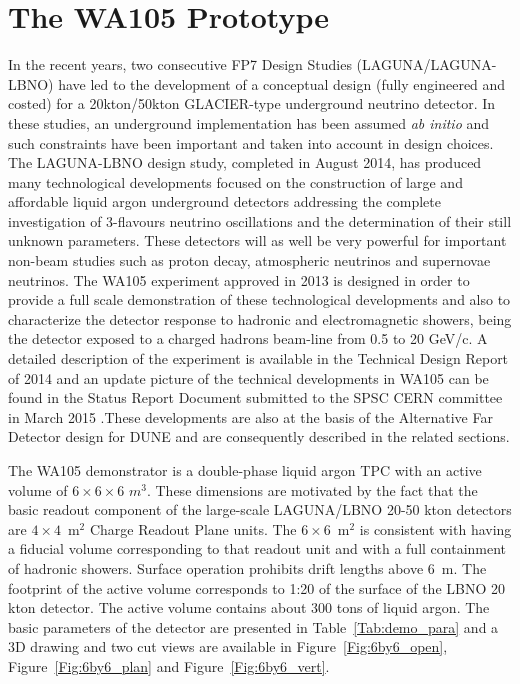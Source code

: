 \section{The WA105 Prototype} 
\label{sec:proto-cern-single}

 In the recent years, two consecutive FP7 Design Studies (LAGUNA/LAGUNA-LBNO) have led to the development
of a conceptual design (fully engineered and costed) for a 20kton/50kton GLACIER-type
underground neutrino detector. In these studies, an underground implementation has been assumed {\it ab initio}
and such constraints have been important and taken into account in design choices. The LAGUNA-LBNO design study, completed in August 2014, has produced many technological developments focused on the construction of  large and affordable liquid argon underground detectors addressing the complete investigation of 3-flavours neutrino oscillations and the determination of their still unknown parameters. These detectors will  as well be very powerful for important non-beam studies such as proton decay, atmospheric neutrinos and supernovae neutrinos. The WA105 experiment approved in 2013 is designed in order to provide a full scale demonstration of these technological developments and also to characterize the detector response to hadronic and electromagnetic showers, being the detector exposed to a charged hadrons beam-line from 0.5 to 20 GeV/c. A detailed description of the experiment is available in the Technical Design Report of 2014  \cite{TDR-WA105} and an update picture of the technical developments in WA105 can be found in the Status Report Document submitted to the SPSC CERN committee in  March 2015 \cite{SREP-WA105}.These developments are also at the basis of the Alternative Far Detector design for DUNE and are consequently described in the related sections.

The WA105 demonstrator is a double-phase liquid argon TPC with an active volume of $6\times 6\times 6$ $m^3$. These dimensions are motivated by the fact that the  basic readout component of the large-scale LAGUNA/LBNO 20-50 kton detectors are $4\times 4$~m$^2$ Charge Readout Plane units. 
The $6\times6$~m$^2$ is consistent with having a fiducial volume corresponding to that readout unit and with a full containment of hadronic showers. 
Surface operation prohibits drift lengths above 6~m. The footprint of the active volume corresponds to 1:20 of the surface of the LBNO 20 kton detector. The active volume contains about 300 tons of liquid argon. The basic parameters of the detector are presented in Table~\ref{Tab:demo_para} and a 3D drawing and two cut views are available in Figure~\ref{Fig:6by6_open},  Figure~\ref{Fig:6by6_plan} and  Figure~\ref{Fig:6by6_vert}.

